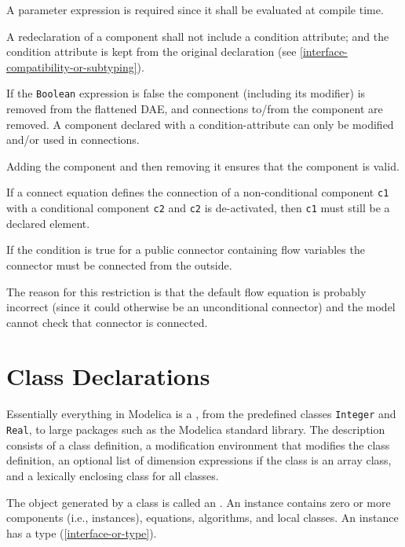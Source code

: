 \begin{nonnormative}
A parameter expression is required since it shall be evaluated at compile time.
\end{nonnormative}

A redeclaration of a component shall not include a condition attribute;
and the condition attribute is kept from the original declaration (see
\cref{interface-compatibility-or-subtyping}).

If the \lstinline!Boolean! expression is false the component (including its modifier) is removed from the flattened DAE, and connections to/from the component are removed.
A component declared with a condition-attribute can only be modified and/or used in connections.

\begin{nonnormative}
Adding the component and then removing it ensures that the component is valid.

If a connect equation defines the connection of a non-conditional component \lstinline!c1! with a conditional component \lstinline!c2! and \lstinline!c2! is de-activated, then \lstinline!c1! must still be a declared element.
\end{nonnormative}

If the condition is true for a public connector containing flow
variables the connector must be connected from the outside.

\begin{nonnormative}
The reason for this restriction is that the default flow equation is probably incorrect (since it could otherwise
be an unconditional connector) and the model cannot check that connector is connected.
\end{nonnormative}

\section{Class Declarations}\label{class-declarations}

Essentially everything in Modelica is a , from the predefined classes \lstinline!Integer! and \lstinline!Real!, to large packages such as the Modelica standard library.
The description consists of a class definition, a modification environment that modifies the class definition, an optional list of dimension expressions if the class is an array class, and a lexically
enclosing class for all classes.

The object generated by a class is called an .
An instance contains zero or more components (i.e., instances), equations, algorithms, and local classes.
An instance has a type (\cref{interface-or-type}).

